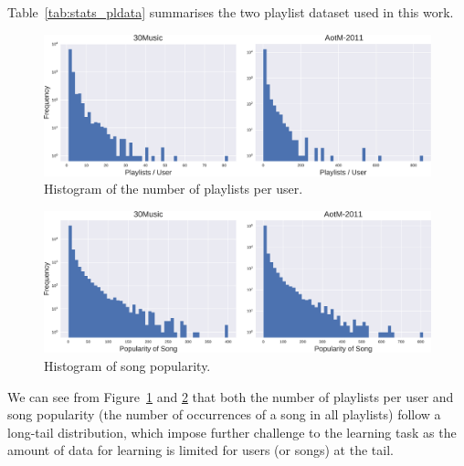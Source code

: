 Table~\ref{tab:stats_pldata} summarises the two playlist dataset used in this work.
%
\begin{table}[!h]
\centering
\caption{Statistics of music playlist dataset}
\label{tab:stats_pldata}
\end{table}


\begin{figure}[h]
\centering
\includegraphics[width=\linewidth]{fig/hist_pluser.pdf}
\caption{Histogram of the number of playlists per user.}
\label{fig:hist_pluser}
\end{figure}

\begin{figure}[h]
\centering
\includegraphics[width=\linewidth]{fig/hist_songpop.pdf}
\caption{Histogram of song popularity.}
\label{fig:hist_songpop}
\end{figure}

We can see from Figure~\ref{fig:hist_pluser} and \ref{fig:hist_songpop} that both the number
of playlists per user and song popularity (\ie the number of occurrences of a song in all playlists)
follow a long-tail distribution, which impose further challenge to the learning task as the amount
of data for learning is limited for users (or songs) at the tail.


